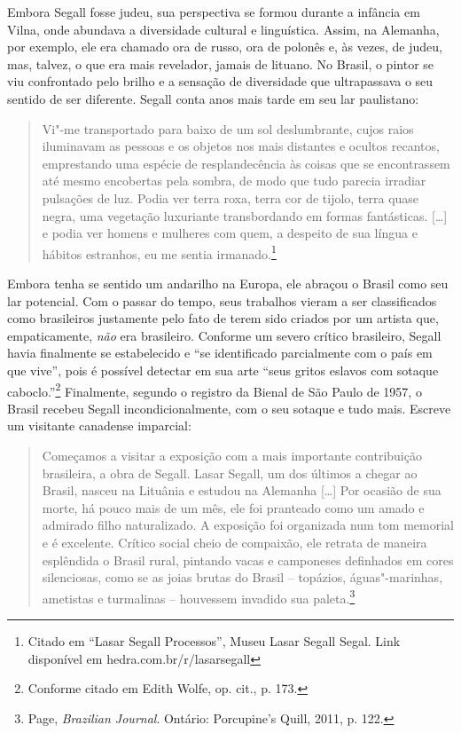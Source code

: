 Embora Segall fosse judeu, sua perspectiva se formou durante a infância
em Vilna, onde abundava a diversidade cultural e linguística. Assim, na
Alemanha, por exemplo, ele era chamado ora de russo, ora de polonês e,
às vezes, de judeu, mas, talvez, o que era mais revelador, jamais de
lituano. No Brasil, o pintor se viu confrontado pelo brilho e a sensação
de diversidade que ultrapassava o seu sentido de ser diferente. Segall conta anos mais
tarde em seu lar paulistano:

\begin{quote}
Vi"-me
transportado para baixo de um sol deslumbrante, cujos raios iluminavam as pessoas e os
objetos nos mais distantes e ocultos recantos, emprestando uma espécie
de resplandecência às coisas que se encontrassem até mesmo encobertas
pela sombra, de modo que tudo parecia irradiar pulsações de luz. Podia
ver terra roxa, terra cor de tijolo, terra quase negra, uma vegetação
luxuriante transbordando em formas fantásticas. {[}\ldots{}{]} e podia
ver homens e mulheres com quem, a despeito de sua língua e hábitos
estranhos, eu me sentia irmanado.\footnote{Citado em ``Lasar Segall
  Processos'', Museu Lasar Segall Segal. Link disponível em hedra.com.br/r/lasarsegall} 
\end{quote}

Embora tenha se sentido um andarilho na
Europa, ele abraçou o Brasil como seu lar potencial. Com o passar do
tempo, seus trabalhos vieram a ser classificados como brasileiros
justamente pelo fato de terem sido criados por um artista que,
empaticamente, \textit{não} era brasileiro. Conforme um severo crítico
brasileiro, Segall havia finalmente se estabelecido e ``se identificado
parcialmente com o país em que vive'', pois é possível detectar em sua
arte ``seus gritos eslavos com sotaque caboclo.''\footnote{Conforme
  citado em Edith Wolfe, op. cit., p. 173.} Finalmente, segundo o registro da Bienal
de São Paulo de 1957, o Brasil recebeu Segall incondicionalmente, com o
seu sotaque e tudo mais. Escreve um
visitante canadense imparcial:

\begin{quote}
Começamos a visitar a exposição com a mais importante contribuição
brasileira, a obra de Segall. Lasar Segall, um dos últimos a chegar ao
Brasil, nasceu na Lituânia e estudou na Alemanha {[}\ldots{}{]} Por
ocasião de sua morte, há pouco mais de um mês, ele foi pranteado como um
amado e admirado filho naturalizado. A exposição foi organizada num tom
memorial e é excelente. Crítico social cheio de compaixão, ele retrata
de maneira esplêndida o Brasil rural, pintando vacas e camponeses
definhados em cores silenciosas, como se as joias brutas do Brasil --
topázios, águas"-marinhas, ametistas e turmalinas -- houvessem invadido
sua paleta.\footnote{ Page, \textit{Brazilian Journal}. Ontário: Porcupine's Quill, 2011, p.
  122.}
\end{quote}

